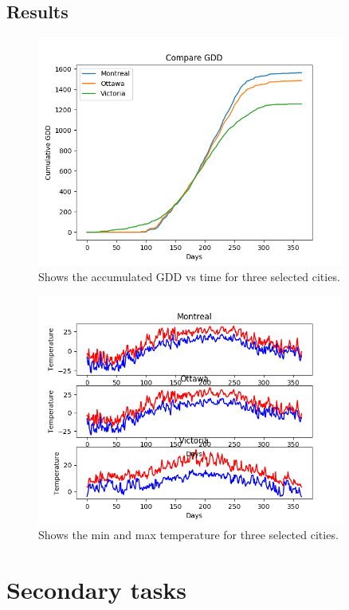 \documentclass[12pt]{article}
\begin{document}
\subsection{Results}
	\begin{figure}[!htbp]
		\centering
		\includegraphics[width=0.9\textwidth]{./Plots/CumulativeGDD.png} 
		\caption{\scriptsize Shows the accumulated GDD vs time for three selected cities.}\label{GDDplot}		  
	\end{figure}

	\begin{figure}[!htbp]
		\centering
		\includegraphics[width=0.9\textwidth]{./Plots/CompareMaxMinTemp.png} 
		\caption{\scriptsize Shows the min and max temperature for three selected cities.}\label{GDDplot}		  
	\end{figure}

\pagebreak
\section{Secondary tasks}
\end{document}
